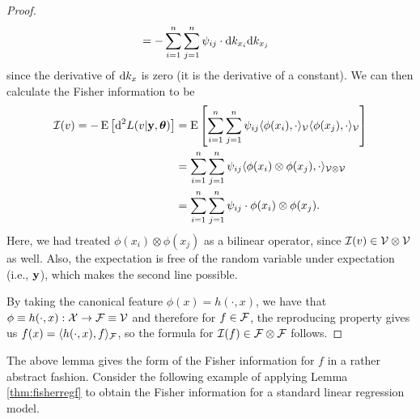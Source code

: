 \begin{proof}
\begin{align*}
		&= - \sum_{i=1}^n\sum_{j=1}^n \psi_{ij} \cdot \text{d} k_{x_i} \text{d} k_{x_j}
	\end{align*}
	since the derivative of $\text{d} k_{x}$ is zero (it is the derivative of a constant).
	We can then calculate the Fisher information to be
	\begin{align*}
		{\mathcal I}(v) = -\operatorname{E} \big[ \text{d}^2 L(v|{\mathbf y},{\bm\theta}) \big] 
		&=\operatorname{E} \left[ \sum_{i=1}^n\sum_{j=1}^n \psi_{ij}  \langle \phi(x_i), \cdot \rangle_{{\mathcal V}} \langle \phi(x_j), \cdot \rangle_{{\mathcal V}} \right] \\
		&= \sum_{i=1}^n\sum_{j=1}^n \psi_{ij}  \langle \phi(x_i) \otimes \phi(x_j), \cdot \rangle_{{\mathcal V}\otimes{\mathcal V}}  \\		
		&=\sum_{i=1}^n\sum_{j=1}^n \psi_{ij} \cdot \phi(x_i) \otimes \phi(x_j).
	\end{align*}	 	
	Here, we had treated $\phi(x_i) \otimes \phi(x_j)$ as a bilinear operator, since ${\mathcal I}(v) \in {\mathcal V} \otimes {\mathcal V}$ as well.
	Also, the expectation is free of the random variable under expectation (i.e., ${\mathbf y}$), which makes the second line possible.
	
	By taking the canonical feature $\phi(x)=h(\cdot,x)$, we have that $\phi \equiv h(\cdot,x):{\mathcal X}\to{\mathcal F} \equiv {\mathcal V}$ and therefore for $f\in{\mathcal F}$, the reproducing property gives us $f(x) = \langle h(\cdot,x),f\rangle_{\mathcal F}$, so the formula for ${\mathcal I}(f) \in {\mathcal F} \otimes {\mathcal F}$ follows.
\end{proof}

The above lemma gives the form of the Fisher information for $f$ in a rather abstract fashion.
Consider the following example of applying Lemma \cref{thm:fisherregf} to obtain the Fisher information for a standard linear regression model.

